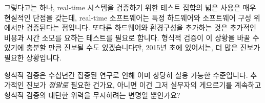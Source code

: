그렇다고는 하나, real-time 시스템을 검증하기 위한 테스트 집합의 넓은 사용은
매우 현실적인 단점을 갖는데, real-time 소프트웨어는 특정 하드웨어와 소프트웨어
구성 위에서만 검증된다는 점입니다.
또다른 하드웨어와 환경구성을 추가하는 것은 추가적인 비용과 시간 소모를 요하는
테스트를 필요로 합니다.
형식적 검증이 이 상황을 바꿀 수 있기에 충분할 만큼 진보될 수도 있겠습니다만,
2015년 초에 있어서는, 더 많은 진보가 필요한 상황입니다.

\QuickQuiz{}
	형식적 검증은 수십년간 집중된 연구로 인해 이미 상당히 실용 가능한
	수준입니다.
	추가적인 진보가 \emph{정말로} 필요한 건가요, 아니면 이건 그저 실무자의
	게으르기를 계속하고 형식적 검증의 대단한 위력을 무시하려는 변명일
	뿐인가요?
	\iffalse

